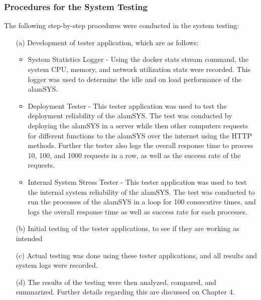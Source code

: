 \subsubsection{Procedures for the System Testing}
\label{subsubsec:proc_mobdev}
The following step-by-step procedures were conducted in the system testing:
\begin{itemize}
    \item[(a)] Development of tester application, which are as follows:
    \begin{itemize}
        \item System Statistics Logger - Using the docker stats stream command, the system 
        CPU, memory, and network utilization stats were recorded. This logger was used
        to determine the idle and on load performance of the alamSYS.
        \item Deployment Tester - This tester application was used to test the deployment
        reliability of the alamSYS. The test was conducted by deploying the alamSYS in a server
        while then other computers requests for different functions to the alamSYS over the internet
        using the HTTP methods. Further the tester also logs the overall response time to
        process 10, 100, and 1000 requests in a row, as well as the success rate of the
        requests.
        \item Internal System Stress Tester - This tester application was used to test the
        internal system reliability of the alamSYS. The test was conducted to run the processes
        of the alamSYS in a loop for 100 consecutive times, and logs the overall response time
        as well as success rate for each processes.
    \end{itemize}
    \item[(b)] Initial testing of the tester applications, to see if
    they are working as intended
    \item[(c)] Actual testing was done using these tester applications, and
    all results and system logs were recorded.
    \item[(d)] The results of the testing were then analyzed, compared, and summarized.
    Further details regarding this are discussed on Chapter 4.
\end{itemize}
\hfill \\